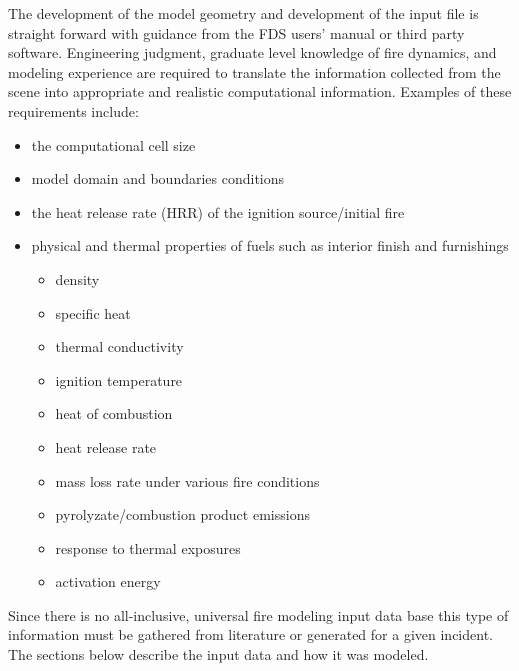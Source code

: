 \documentclass[11pt,oneside]{book}
\begin{document}
The development of the model geometry and development of the input file is straight forward with guidance from the FDS users' manual \cite{FDS_Users_Guide} or third party software.  Engineering judgment, graduate level knowledge of fire dynamics, and modeling experience are required to  translate the information collected from the scene into appropriate and realistic computational information.  Examples of these requirements include:
\begin{itemize}
\item the computational cell size
\item model domain and boundaries conditions
\item the heat release rate (HRR) of the ignition source/initial fire
\item physical and thermal properties of fuels such as interior finish and furnishings
	\begin{itemize}
	\item density
	\item specific heat
	\item thermal conductivity
	\item ignition temperature
	\item heat of combustion
	\item heat release rate
	\item mass loss rate under various fire conditions
	\item pyrolyzate/combustion product emissions
	\item response to thermal exposures
	\item activation energy
	\end{itemize}
\end{itemize}
Since there is no all-inclusive, universal fire modeling input data base this type of information must be gathered from literature or generated for a given incident.  The sections below describe the input data and how it was modeled. 
\end{document}
